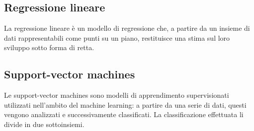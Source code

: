 	\subsection{Regressione lineare}
		La regressione lineare è un modello di regressione che, a partire da un insieme di dati rappresentabili come punti su un piano, restituisce una stima sul loro sviluppo sotto forma di retta.
	\subsection{Support-vector machines}
		Le support-vector machines sono modelli di apprendimento supervisionati utilizzati nell'ambito del machine learning\glo: a partire da una serie di dati, questi vengono analizzati e successivamente classificati. La classificazione effettuata li divide in due sottoinsiemi.



